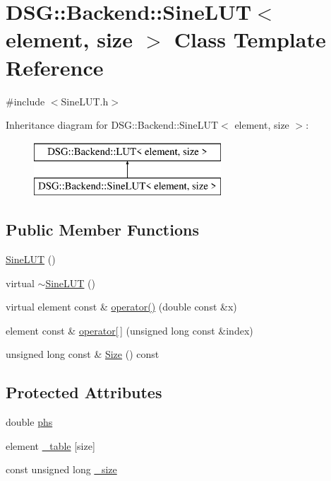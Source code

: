 \hypertarget{classDSG_1_1Backend_1_1SineLUT}{\section{D\+S\+G\+:\+:Backend\+:\+:Sine\+L\+U\+T$<$ element, size $>$ Class Template Reference}
\label{classDSG_1_1Backend_1_1SineLUT}
}


{\ttfamily \#include $<$Sine\+L\+U\+T.\+h$>$}

Inheritance diagram for D\+S\+G\+:\+:Backend\+:\+:Sine\+L\+U\+T$<$ element, size $>$\+:\begin{figure}[H]
\begin{center}
\leavevmode
\includegraphics[height=2.000000cm]{classDSG_1_1Backend_1_1SineLUT}
\end{center}
\end{figure}
\subsection*{Public Member Functions}
\begin{DoxyCompactItemize}
\item 
\hyperlink{classDSG_1_1Backend_1_1SineLUT_a9da7b21af95cd94c4f7b9bd6b71cbb70}{Sine\+L\+U\+T} ()
\item 
virtual \hyperlink{classDSG_1_1Backend_1_1SineLUT_af910f9329f237b770c6b409b598fe5c9}{$\sim$\+Sine\+L\+U\+T} ()
\item 
virtual element const \& \hyperlink{classDSG_1_1Backend_1_1SineLUT_a52f73d7656d11c5cc0b6e937dbd8e2b8}{operator()} (double const \&x)
\item 
element const \& \hyperlink{classDSG_1_1Backend_1_1LUT_a50d8304c33760ed566039ebf5657807c}{operator\mbox{[}$\,$\mbox{]}} (unsigned long const \&index)
\item 
unsigned long const \& \hyperlink{classDSG_1_1Backend_1_1LUT_a988c07b5002e0aee6e490244b80c8830}{Size} () const 
\end{DoxyCompactItemize}
\subsection*{Protected Attributes}
\begin{DoxyCompactItemize}
\item 
double \hyperlink{classDSG_1_1Backend_1_1SineLUT_a4745a2ef3a5cec8f2822fa12174e059b}{phs}
\item 
element \hyperlink{classDSG_1_1Backend_1_1LUT_a23615428e84d6be4424c8b897866f253}{\+\_\+table} \mbox{[}size\mbox{]}
\item 
const unsigned long \hyperlink{classDSG_1_1Backend_1_1LUT_ae18fa23936c51c1bdbd21311c9f1054e}{\+\_\+size}
\end{DoxyCompactItemize}


